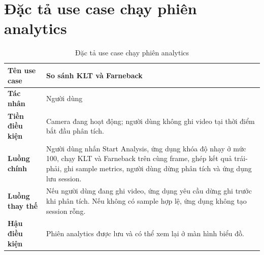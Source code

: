 \documentclass[../DoAn.tex]{subfiles}
\begin{document}
\section{Đặc tả use case chạy phiên analytics}
\begin{table}[H]
\centering
\begin{tabular}{|p{4cm}|p{9cm}|}
\hline
\textbf{Tên use case} & So sánh KLT và Farneback \\ \hline
\textbf{Tác nhân} & Người dùng \\ \hline
\textbf{Tiền điều kiện} & Camera đang hoạt động; người dùng không ghi video tại thời điểm bắt đầu phân tích. \\ \hline
\textbf{Luồng chính} & Người dùng nhấn Start Analysis, ứng dụng khóa độ nhạy ở mức 100, chạy KLT và Farneback trên cùng frame, ghép kết quả trái-phải, ghi sample metrics, người dùng dừng phân tích và ứng dụng lưu session. \\ \hline
\textbf{Luồng thay thế} & Nếu người dùng đang ghi video, ứng dụng yêu cầu dừng ghi trước khi phân tích. Nếu không có sample hợp lệ, ứng dụng không tạo session rỗng. \\ \hline
\textbf{Hậu điều kiện} & Phiên analytics được lưu và có thể xem lại ở màn hình biểu đồ. \\ \hline
\end{tabular}
\caption{Đặc tả use case chạy phiên analytics}
\end{table}
\end{document}
